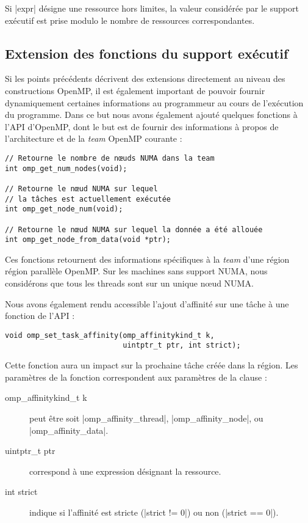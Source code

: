 Si |expr| désigne une ressource hors limites, la valeur considérée par le support exécutif est prise modulo le nombre de ressources correspondantes.

\subsection{Extension des fonctions du support exécutif}

Si les points précédents décrivent des extensions directement au niveau des constructions OpenMP, il est également important de pouvoir fournir dynamiquement certaines informations au programmeur au cours de l'exécution du programme.
Dans ce but nous avons également ajouté quelques fonctions à l'API d'OpenMP, dont le but est de fournir des informations à propos de l'architecture et de la \emph{team} OpenMP courante :

\begin{lstlisting}
// Retourne le nombre de nœuds NUMA dans la team
int omp_get_num_nodes(void);

// Retourne le nœud NUMA sur lequel
// la tâches est actuellement exécutée
int omp_get_node_num(void);

// Retourne le nœud NUMA sur lequel la donnée a été allouée
int omp_get_node_from_data(void *ptr);
\end{lstlisting}

Ces fonctions retournent des informations spécifiques à la \emph{team} d'une région région parallèle OpenMP.
Sur les machines sans support NUMA, nous considérons que tous les threads sont sur un unique nœud NUMA.

Nous avons également rendu accessible l'ajout d'affinité sur une tâche à une fonction de l'API :
\begin{lstlisting}
void omp_set_task_affinity(omp_affinitykind_t k,
                           uintptr_t ptr, int strict);
\end{lstlisting}
Cette fonction aura un impact sur la prochaine tâche créée dans la région.
Les paramètres de la fonction correspondent aux paramètres de la clause :

\begin{description}
  \item [omp\_affinitykind\_t k] peut être soit |omp_affinity_thread|, |omp_affinity_node|, ou |omp_affinity_data|.
  \item [uintptr\_t ptr] correspond à une expression désignant la ressource.
  \item [int strict] indique si l'affinité est stricte (|strict != 0|) ou non (|strict == 0|).
\end{description}


